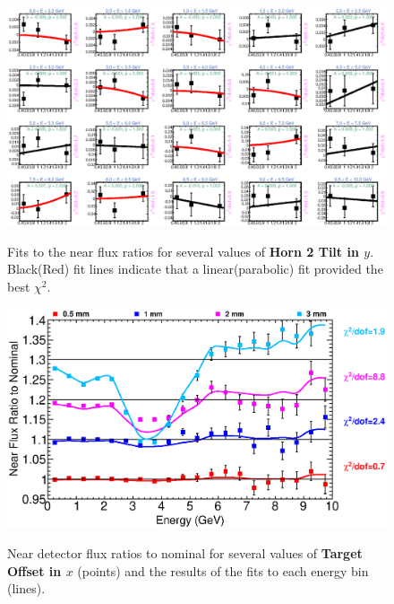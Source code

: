 {\begin{figure}[ht]
  \begin{center}
    {\includegraphics[width=5.0in]{figures/Horn2YTilt_near_fits.eps}}
  \end{center}
\caption{ Fits to the near flux ratios for several values of {\bf Horn 2 Tilt in $y$}. Black(Red) fit lines indicate that a linear(parabolic) fit provided the best $\chi^2$. }
\end{figure}

\begin{figure}[ht]
  \begin{center}
    {\includegraphics[width=6.0in]{figures/TargetXOffset_near_summary.eps}}
  \end{center}
\caption{ Near detector flux ratios to nominal for several values of {\bf Target Offset in $x$} (points) and the results of the fits to each energy bin (lines).}
\end{figure}

}
